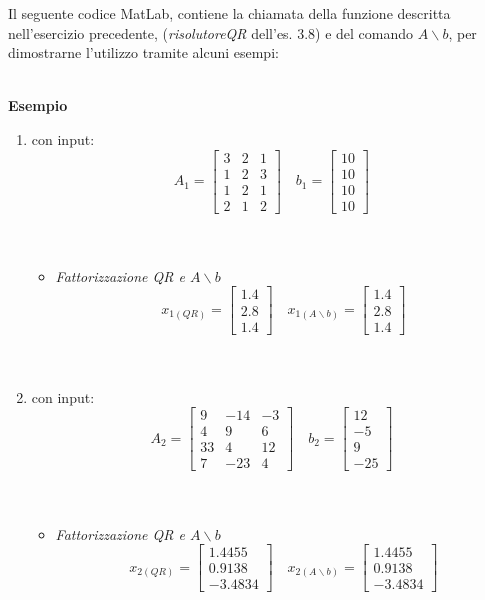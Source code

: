Il seguente codice MatLab, contiene la chiamata della funzione descritta nell'esercizio precedente, (\textit{risolutoreQR}  dell'es. 3.8) e del comando $A \backslash b$, per dimostrarne l'utilizzo tramite alcuni esempi:\\\
	
\textbf{Esempio}
\begin{enumerate} 
	\item con input:
		\[
		A_1 =\begin{bmatrix}
			3 & 2 & 1 \\
			1 & 2 & 3 \\
			1 & 2 & 1 \\
			2 & 1 & 2 
		\end{bmatrix} \quad
		b_1 =\begin{bmatrix}
			10 \\
			10 \\
			10 \\
			10
		\end{bmatrix}
		\]\\\
	\begin{itemize}
		\item \textit{Fattorizzazione QR e $A \backslash b$}
			\[
			x_{1(QR)} =\begin{bmatrix}
				1.4 \\
				2.8 \\
				1.4
			\end{bmatrix} \quad
			x_{1(A \backslash b)} =\begin{bmatrix}
				1.4 \\
				2.8 \\
				1.4
			\end{bmatrix}
			\]\\\	
	\end{itemize}
	\item con input:
		\[
		A_2 =\begin{bmatrix}
			9  & -14 & -3 \\
			4  & 9	 & 6  \\
			33 & 4   & 12 \\
			7  & -23 & 4 
		\end{bmatrix} \quad
		b_2 =\begin{bmatrix}
			12  \\
			-5  \\
			9   \\
			-25
		\end{bmatrix}
		\]\\\
	\begin{itemize}
		\item \textit{Fattorizzazione QR e $A \backslash b$}
			\[
			x_{2(QR)} =\begin{bmatrix}
				1.4455  \\
				0.9138  \\
				-3.4834
			\end{bmatrix} \quad
			x_{2(A \backslash b)} =\begin{bmatrix}
				1.4455  \\
				0.9138  \\
				-3.4834
			\end{bmatrix}
			\]	
	\end{itemize}
\end{enumerate}